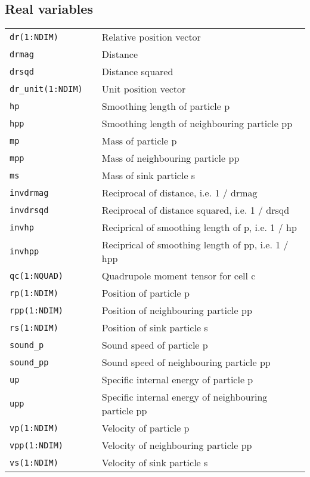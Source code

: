 \documentclass[a4paper]{article}
\newcommand{\var}[1]{\texttt{#1}}
\begin{document}
\subsection{Real variables}
\begin{tabular}{lll}
\var{dr(1:NDIM)}  &  &  Relative position vector \\
\var{drmag}       &  &  Distance \\
\var{drsqd}       &  &  Distance squared \\
\var{dr\_unit(1:NDIM)} &  &  Unit position vector \\
\var{hp}          &  &  Smoothing length of particle p \\
\var{hpp}         &  &  Smoothing length of neighbouring particle pp \\
\var{mp}          &  &  Mass of particle p \\
\var{mpp}         &  &  Mass of neighbouring particle pp \\
\var{ms}          &  &  Mass of sink particle s \\
\var{invdrmag}    &  &  Reciprocal of distance, i.e. 1 / drmag \\
\var{invdrsqd}    &  &  Reciprocal of distance squared, i.e. 1 / drsqd \\
\var{invhp}       &  &  Reciprical of smoothing length of p, i.e. 1 / hp \\
\var{invhpp}      &  &  Reciprical of smoothing length of pp, i.e. 1 / hpp \\
\var{qc(1:NQUAD)} &  &  Quadrupole moment tensor for cell c \\
\var{rp(1:NDIM)}  &  &  Position of particle p \\
\var{rpp(1:NDIM)} &  &  Position of neighbouring particle pp  \\
\var{rs(1:NDIM)}  &  &  Position of sink particle s \\
\var{sound\_p}    &  &  Sound speed of particle p \\
\var{sound\_pp}   &  &  Sound speed of neighbouring particle pp \\
\var{up}          &  &  Specific internal energy of particle p \\
\var{upp}         &  &  Specific internal energy of neighbouring particle pp \\
\var{vp(1:NDIM)}  &  &  Velocity of particle p \\
\var{vpp(1:NDIM)} &  &  Velocity of neighbouring particle pp \\
\var{vs(1:NDIM)}  &  &  Velocity of sink particle s \\
\end{tabular}
\end{document}
